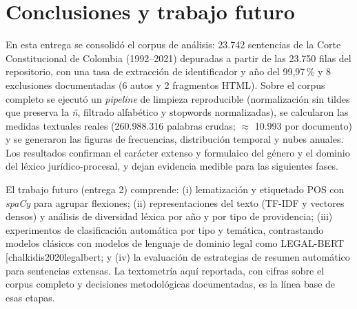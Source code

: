 \documentclass[11pt]{tg_usta}
\makeatletter
\renewcommand{\cite}{\@ifnextchar[{\@tempswatrue\@citex}{\@tempswafalse\@citex[]}}
\makeatother
\begin{document}
\section{Conclusiones y trabajo futuro}
En esta entrega se consolidó el corpus de análisis: 23.742 sentencias de la Corte Constitucional de Colombia (1992--2021) depuradas a partir de las 23.750 filas del repositorio, con una tasa de extracción de identificador y año del 99,97\,\% y 8 exclusiones documentadas (6 autos y 2 fragmentos HTML). Sobre el corpus completo se ejecutó un \emph{pipeline} de limpieza reproducible (normalización sin tildes que preserva la \emph{ñ}, filtrado alfabético y stopwords normalizadas), se calcularon las medidas textuales reales (260.988.316 palabras crudas; $\approx$ 10.993 por documento) y se generaron las figuras de frecuencias, distribución temporal y nubes anuales. Los resultados confirman el carácter extenso y formulaico del género y el dominio del léxico jurídico-procesal, y dejan evidencia medible para las siguientes fases.

El trabajo futuro (entrega 2) comprende: (i) lematización y etiquetado POS con \emph{spaCy} para agrupar flexiones; (ii) representaciones del texto (TF-IDF y vectores densos) y análisis de diversidad léxica por año y por tipo de providencia; (iii) experimentos de clasificación automática por tipo y temática, contrastando modelos clásicos con modelos de lenguaje de dominio legal como LEGAL-BERT \cite{chalkidis2020legalbert}; y (iv) la evaluación de estrategias de resumen automático para sentencias extensas. La textometría aquí reportada, con cifras sobre el corpus completo y decisiones metodológicas documentadas, es la línea base de esas etapas.


{\small}
\end{document}
